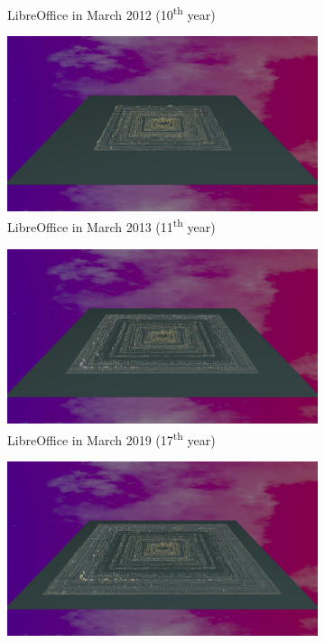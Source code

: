 \begin{figure}[ht]
\begin{subfigure}{0.48\textwidth}
        \caption{LibreOffice in March 2012 (10\textsuperscript{th} year)} 
        \label{fig:Libre_V6_S3}
    \end{subfigure}\hspace*{\fill}
    \begin{subfigure}{0.48\textwidth}
        \includegraphics[width=\linewidth]{Libreoffice/Animation011.png}
        \caption{LibreOffice in March 2013 (11\textsuperscript{th} year)} 
        \label{fig:Libre_V6_S4}
    \end{subfigure}
    \medskip
    \begin{subfigure}{0.48\textwidth}
        \includegraphics[width=\linewidth]{Libreoffice/Animation017.png}
        \caption{LibreOffice in March 2019 (17\textsuperscript{th} year)} 
        \label{fig:Libre_V6_S5}
    \end{subfigure}\hspace*{\fill}
    \begin{subfigure}{0.48\textwidth}
        \includegraphics[width=\linewidth]{Libreoffice/Animation021.png}

\end{subfigure}
\end{figure}

